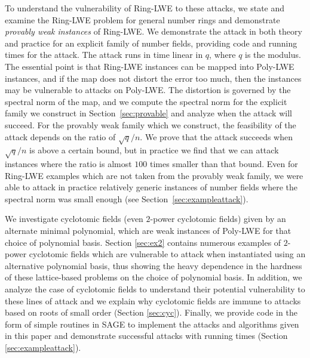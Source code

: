 \documentclass{llncs}
\newcommand{\<}{\langle}
\renewcommand{\>}{\rangle}
\begin{document}
To understand the vulnerability of Ring-LWE to these attacks, we state and examine the Ring-LWE problem for general number rings and demonstrate {\it provably weak instances} of Ring-LWE.  We demonstrate the attack in both theory and practice for an explicit family of number fields, providing code and running times for the attack.   The attack runs in time linear in $q$, where $q$ is the modulus.  The essential point is that Ring-LWE instances can be mapped into Poly-LWE instances, and if the map does not distort the error too much, then the instances may be vulnerable to attacks on Poly-LWE.
The distortion is governed by the spectral norm of the map, and we compute the spectral norm for the explicit family we construct in Section~\ref{sec:provable} and analyze when the attack will succeed.
%
For the provably weak family which we construct, the feasibility of the attack depends on the ratio of $\sqrt{q}/n$.  We prove that the attack succeeds when $\sqrt{q}/n$ is above a certain bound, but in practice we find that we can attack instances where the ratio is almost $100$ times smaller than that bound.
%
Even for Ring-LWE examples which are not taken from the provably weak family, we were able to attack in practice relatively generic instances of number fields  where the spectral norm was small enough (see Section~\ref{sec:exampleattack}).


 We investigate cyclotomic fields (even $2$-power cyclotomic fields) given by an alternate minimal polynomial, which are weak instances of Poly-LWE for that choice of polynomial basis. Section \ref{sec:ex2} contains numerous examples of $2$-power cyclotomic fields which are vulnerable to attack when instantiated using an alternative polynomial basis, thus showing the heavy dependence in the hardness of these lattice-based problems on the choice of polynomial basis.
In addition, we analyze the case of cyclotomic fields to understand their potential vulnerability to these lines of attack
and we explain why cyclotomic fields are immune to attacks based on roots of small order (Section \ref{sec:cyc}).
Finally, we provide code in the form of simple routines in SAGE to implement the attacks and algorithms given in this paper and demonstrate successful attacks with running times (Section \ref{sec:exampleattack}).
\end{document}
